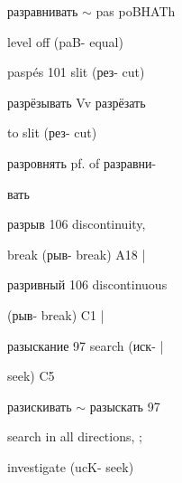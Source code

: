 \begin{minipage}[t]{0.475\textwidth}
\noindent разравнивать $\sim$ pas poBHATh\par
{} level off (paB- equal)\par
\noindent paspés 101 slit (рез- cut)\par
\noindent разрёзывать Vv разрёзать\par
{} to slit (рез- cut)\par
\noindent разровнять pf. of разравни-\par
\noindent вать\par
\noindent разрыв 106 discontinuity,\par
\noindent break (рыв- break) A18 |\par
\noindent разривный 106 discontinuous\par
\noindent (рыв- break) C1 |\par
\noindent разыскание 97 search (иск- |\par
\noindent seek) C5\par
\noindent разискивать $\sim$ разыскать 97\par
\noindent search in all directions, ;\par
\noindent investigate (ucK- seek)\par
\end{minipage}\hfill
